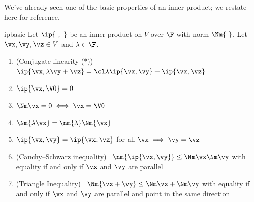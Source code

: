 We've already seen one of the basic properties of an inner product; we restate here for reference.

\begin{lemm}{}{ipbasic}
Let $\ip{\ ,\ }$ be an inner product on $V$ over $\F$ with norm $\Nm{\ }$. Let $\vx,\vy,\vz\in V$ and $\lambda\in\F$.
\begin{enumerate}
  \item (Conjugate-linearity ($\ast$)) \ $\ip{\vx,\lambda\vy+\vz} =\cl\lambda\ip{\vx,\vy}+\ip{\vx,\vz}$
  \item $\ip{\vx,\V0}=0$
  \item $\Nm\vx=0\iff \vx=\V0$
  \item $\Nm{\lambda\vx}=\nm{\lambda}\Nm{\vx}$
  \item $\ip{\vx,\vy}=\ip{\vx,\vz}$ for all $\vx\implies \vy=\vz$
  \item (Cauchy--Schwarz inequality) \ $\nm{\ip{\vx,\vy}}\le\Nm\vx\Nm\vy$ with equality if and only if $\vx$ and $\vy$ are parallel
  \item (Triangle Inequality) \ $\Nm{\vx+\vy}\le\Nm\vx+\Nm\vy$ with equality if and only if $\vx$ and $\vy$ are parallel and point in the same direction
\end{enumerate}
\end{lemm}

